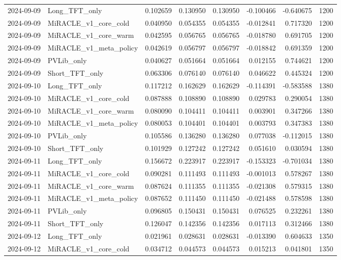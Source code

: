 \begin{tabular}{llrrrrrr}
2024-09-09 & Long_TFT_only & 0.102659 & 0.130950 & 0.130950 & -0.100466 & -0.640675 & 1200 \\
2024-09-09 & MiRACLE_v1_core_cold & 0.040950 & 0.054355 & 0.054355 & -0.012841 & 0.717320 & 1200 \\
2024-09-09 & MiRACLE_v1_core_warm & 0.042595 & 0.056765 & 0.056765 & -0.018780 & 0.691705 & 1200 \\
2024-09-09 & MiRACLE_v1_meta_policy & 0.042619 & 0.056797 & 0.056797 & -0.018842 & 0.691359 & 1200 \\
2024-09-09 & PVLib_only & 0.040627 & 0.051664 & 0.051664 & 0.012155 & 0.744621 & 1200 \\
2024-09-09 & Short_TFT_only & 0.063306 & 0.076140 & 0.076140 & 0.046622 & 0.445324 & 1200 \\
2024-09-10 & Long_TFT_only & 0.117212 & 0.162629 & 0.162629 & -0.114391 & -0.583588 & 1380 \\
2024-09-10 & MiRACLE_v1_core_cold & 0.087888 & 0.108890 & 0.108890 & 0.029783 & 0.290054 & 1380 \\
2024-09-10 & MiRACLE_v1_core_warm & 0.080090 & 0.104411 & 0.104411 & 0.003901 & 0.347266 & 1380 \\
2024-09-10 & MiRACLE_v1_meta_policy & 0.080053 & 0.104401 & 0.104401 & 0.003793 & 0.347383 & 1380 \\
2024-09-10 & PVLib_only & 0.105586 & 0.136280 & 0.136280 & 0.077038 & -0.112015 & 1380 \\
2024-09-10 & Short_TFT_only & 0.101929 & 0.127242 & 0.127242 & 0.051610 & 0.030594 & 1380 \\
2024-09-11 & Long_TFT_only & 0.156672 & 0.223917 & 0.223917 & -0.153323 & -0.701034 & 1380 \\
2024-09-11 & MiRACLE_v1_core_cold & 0.090281 & 0.111493 & 0.111493 & -0.001013 & 0.578267 & 1380 \\
2024-09-11 & MiRACLE_v1_core_warm & 0.087624 & 0.111355 & 0.111355 & -0.021308 & 0.579315 & 1380 \\
2024-09-11 & MiRACLE_v1_meta_policy & 0.087652 & 0.111450 & 0.111450 & -0.021488 & 0.578598 & 1380 \\
2024-09-11 & PVLib_only & 0.096805 & 0.150431 & 0.150431 & 0.076525 & 0.232261 & 1380 \\
2024-09-11 & Short_TFT_only & 0.126047 & 0.142356 & 0.142356 & 0.017113 & 0.312466 & 1380 \\
2024-09-12 & Long_TFT_only & 0.021961 & 0.028631 & 0.028631 & -0.013390 & 0.604633 & 1350 \\
2024-09-12 & MiRACLE_v1_core_cold & 0.034712 & 0.044573 & 0.044573 & 0.015213 & 0.041801 & 1350 \\

\end{tabular}
